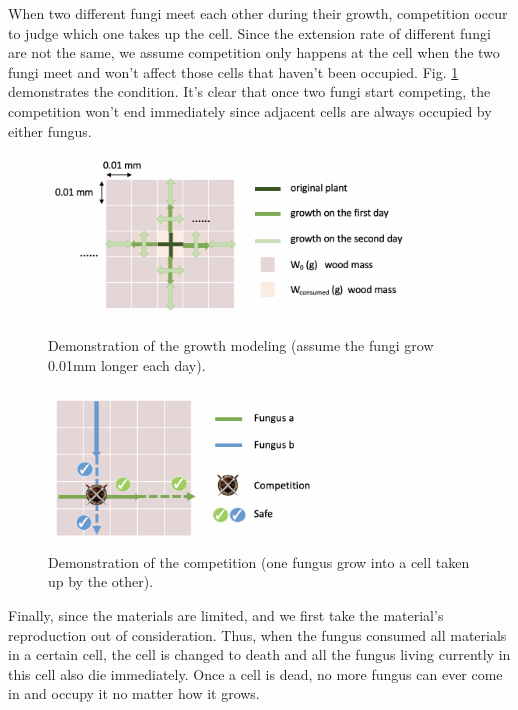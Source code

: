 \documentclass[a4paper,12pt]{article}
\begin{document}
When two different fungi meet each other during their growth, competition occur to judge which one takes up the cell. Since the extension rate of different fungi are not the same, we assume competition only happens at the cell when the two fungi meet and won't affect those cells that haven't been occupied. Fig. \ref{compete} demonstrates the condition. It's clear that once two fungi start competing, the competition won't end immediately since adjacent cells are always occupied by either fungus.

\begin{figure}[H] 
	\begin{minipage}{45ex}
	\includegraphics[height=4.3cm]{./figures/wood}
	\caption{Demonstration of the growth modeling (assume the fungi grow 0.01mm longer each day).}
	\label{wood}
	\end{minipage} \quad
	\begin{minipage}{45ex}
	\qquad \quad
	\includegraphics[height=4.2cm]{./figures/compete}
	\caption{Demonstration of the competition (one fungus grow into a cell taken up by the other).}
	\label{compete}
	\end{minipage}
\end{figure}


Finally, since the materials are limited, and we first take the material's reproduction out of consideration. Thus, when the fungus consumed all materials in a certain cell, the cell is changed to death and all the fungus living currently in this cell also die immediately. Once a cell is dead, no more fungus can ever come in and occupy it no matter how it grows. 
\end{document}
